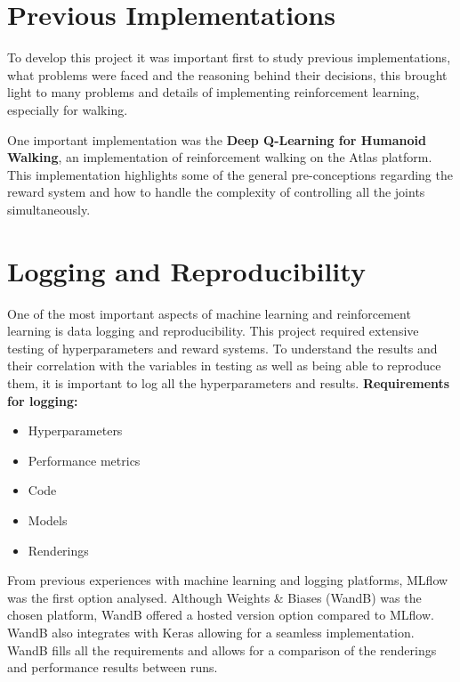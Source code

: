 \section{Previous Implementations}
To develop this project it was important first to study previous implementations, what problems were faced and the reasoning behind their decisions, 
this brought light to many problems and details of implementing reinforcement learning, especially for walking.

One important implementation was the \textbf{Deep Q-Learning for Humanoid Walking}\cite{atlas_rl}, an implementation of reinforcement walking on the Atlas platform.
This implementation highlights some of the general pre-conceptions regarding the reward system and how to handle the complexity of controlling all the joints simultaneously.

\section{Logging and Reproducibility}
One of the most important aspects of machine learning and reinforcement learning is data logging and reproducibility. 
This project required extensive testing of hyperparameters and reward systems. 
To understand the results and their correlation with the variables in testing as well as being able to reproduce them, it is important to log all the hyperparameters and results.\linebreak
\textbf{Requirements for logging:}
\begin{itemize}[leftmargin=+0.5in]
 \item Hyperparameters
 \item Performance metrics
 \item Code
 \item Models
 \item Renderings
\end{itemize}
From previous experiences with machine learning and logging platforms, MLflow was the first option analysed. Although Weights \& Biases (WandB) was the chosen platform, WandB offered a hosted version option compared to MLflow. 
WandB also integrates with Keras allowing for a seamless implementation. WandB fills all the requirements and allows for a comparison of the renderings and performance results between runs.